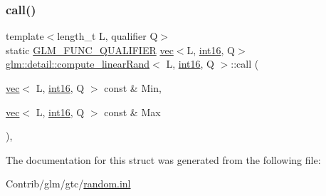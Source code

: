 \subsubsection{\texorpdfstring{call()}{call()}}
{\footnotesize\ttfamily template$<$length\+\_\+t L, qualifier Q$>$ \\
static \mbox{\hyperlink{setup_8hpp_a33fdea6f91c5f834105f7415e2a64407}{G\+L\+M\+\_\+\+F\+U\+N\+C\+\_\+\+Q\+U\+A\+L\+I\+F\+I\+ER}} \mbox{\hyperlink{structglm_1_1vec}{vec}}$<$L, \mbox{\hyperlink{namespaceglm_1_1detail_a375938874ca4f0a0982ec6373b56117b}{int16}}, Q$>$ \mbox{\hyperlink{structglm_1_1detail_1_1compute__linear_rand}{glm\+::detail\+::compute\+\_\+linear\+Rand}}$<$ L, \mbox{\hyperlink{namespaceglm_1_1detail_a375938874ca4f0a0982ec6373b56117b}{int16}}, Q $>$\+::call (\begin{DoxyParamCaption}\item[{\mbox{\hyperlink{structglm_1_1vec}{vec}}$<$ L, \mbox{\hyperlink{namespaceglm_1_1detail_a375938874ca4f0a0982ec6373b56117b}{int16}}, Q $>$ const \&}]{Min,  }\item[{\mbox{\hyperlink{structglm_1_1vec}{vec}}$<$ L, \mbox{\hyperlink{namespaceglm_1_1detail_a375938874ca4f0a0982ec6373b56117b}{int16}}, Q $>$ const \&}]{Max }\end{DoxyParamCaption})\hspace{0.3cm}{\ttfamily [inline]}, {\ttfamily [static]}}



The documentation for this struct was generated from the following file\+:\begin{DoxyCompactItemize}
\item 
Contrib/glm/gtc/\mbox{\hyperlink{random_8inl}{random.\+inl}}\end{DoxyCompactItemize}
